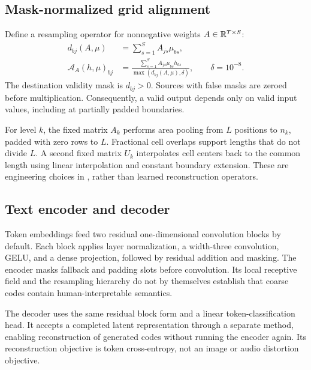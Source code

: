 \documentclass[11pt,a4paper]{article}
\begin{document}
\subsection{Mask-normalized grid alignment}
Define a resampling operator for nonnegative weights \(A\in\mathbb{R}^{T\times S}\):
\begin{align}
 d_{bj}(A,\mu)&=\sum_{s=1}^{S} A_{js}\mu_{bs},\\
 \mathcal{A}_{A}(h,\mu)_{bj}
 &=\frac{\sum_{s=1}^{S} A_{js}\mu_{bs}h_{bs}}
 {\max(d_{bj}(A,\mu),\delta)},\qquad \delta=10^{-8}.
 \label{eq:align}
\end{align}
The destination validity mask is \(d_{bj}>0\). Sources with false masks are
zeroed before multiplication. Consequently, a valid output depends only on
valid input values, including at partially padded boundaries.

For level \(k\), the fixed matrix \(A_k\) performs area pooling from \(L\)
positions to \(n_k\), padded with zero rows to \(L\). Fractional cell overlaps
support lengths that do not divide \(L\). A second fixed matrix \(U_k\)
interpolates cell centers back to the common length using linear interpolation
and constant boundary extension. These are engineering choices in
, rather than learned reconstruction operators.

\subsection{Text encoder and decoder}
Token embeddings feed two residual one-dimensional convolution blocks by
default. Each block applies layer normalization, a width-three convolution,
GELU, and a dense projection, followed by residual addition and masking.
The encoder masks fallback and padding slots before convolution. Its local
receptive field and the resampling hierarchy do not by themselves establish
that coarse codes contain human-interpretable semantics.

The decoder uses the same residual block form and a linear token-classification
head. It accepts a completed latent representation through a separate
 method, enabling reconstruction of generated codes without
running the encoder again. Its reconstruction objective is token
cross-entropy, not an image or audio distortion objective.
\end{document}
